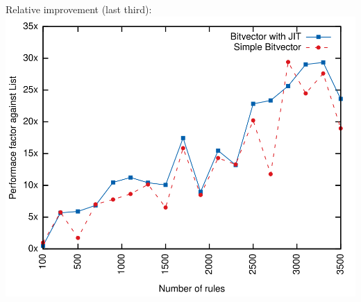 \documentclass[xcolor=x11names,compress]{beamer}
\renewcommand{\(}{\begin{columns}}
\renewcommand{\)}{\end{columns}}
\newcommand{\<}[1]{\begin{column}{#1}}
\renewcommand{\>}{\end{column}}
\begin{document}
\begin{frame}[noframenumbering]
  Relative improvement (last third):
  \includegraphics[height=0.9\textheight]{figures/eval_w_relative}
\end{frame}
\end{document}
